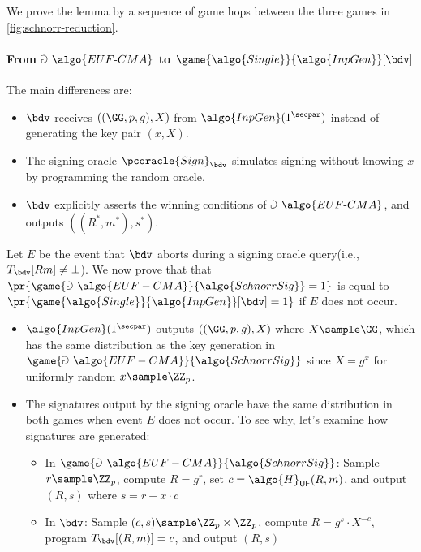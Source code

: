 \ifsolutions
\begin{mysolution}
  We prove the lemma by a sequence of game hops between the three games in \autoref{fig:schnorr-reduction}.

  \paragraph{From $\Game~\algo{EUF\text{-}CMA}$ to $\game{\algo{Single}}{\algo{InpGen}}[\bdv]$}
  The main differences are:
  \begin{itemize}
    \item $\bdv$ receives $((\GG, p, g), X)$ from $\algo{InpGen}(1^\secpar)$ instead of generating the key pair $(x, X)$.
    \item The signing oracle $\pcoracle{Sign}_{\bdv}$ simulates signing without knowing $x$ by programming the random oracle.
    \item $\bdv$ explicitly asserts the winning conditions of $\Game~\algo{EUF\text{-}CMA}$, and outputs $((R^*, m^*), s^*)$.
  \end{itemize}

  Let $E$ be the event that $\bdv$ aborts during a signing oracle query(i.e., $T_{\bdv}[R  m] \neq \bot$).
  We now prove that that $\pr{\game{\Game~\algo{EUF-CMA}}{\algo{SchnorrSig}} = 1}$ is equal to $\pr{\game{\algo{Single}}{\algo{InpGen}}[\bdv] = 1}$ if $E$ does not occur.
  \begin{itemize}
    \item $\algo{InpGen}(1^\secpar)$ outputs $((\GG, p, g), X)$ where $X \sample \GG$, which has the same distribution as the key generation in $\game{\Game~\algo{EUF-CMA}}{\algo{SchnorrSig}}$ since $X = g^x$ for uniformly random $x \sample \ZZ_p$.
    \item The signatures output by the signing oracle have the same distribution in both games when event $E$ does not occur. To see why, let's examine how signatures are generated:
    \begin{itemize}
      \item In $\game{\Game~\algo{EUF-CMA}}{\algo{SchnorrSig}}$: Sample $r \sample \ZZ_p$, compute $R = g^r$, set $c = \algo{H}_{\mathsf{UF}}(R, m)$, and output $(R,
  s)$ where $s = r + x \cdot c$
      \item In $\bdv$: Sample $(c, s) \sample \ZZ_p \times \ZZ_p$, compute $R = g^s \cdot X^{-c}$, program $T_{\bdv}[(R, m)] = c$, and output $(R, s)$
    \end{itemize}


\end{itemize}
\end{mysolution}

